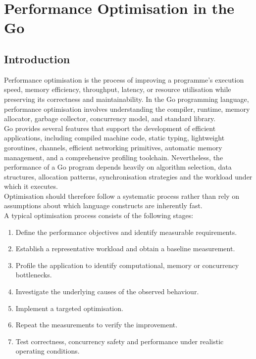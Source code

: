 \section{Performance Optimisation in the Go}

\subsection{Introduction}

Performance optimisation is the process of improving a programme's execution speed, memory efficiency, throughput, latency, or resource utilisation while preserving its correctness and maintainability. In the Go programming language, performance optimisation involves understanding the compiler, runtime, memory allocator, garbage collector, concurrency model, and standard library.\\

Go provides several features that support the development of efficient applications, including compiled machine code, static typing, lightweight goroutines, channels, efficient networking primitives, automatic memory management, and a comprehensive profiling toolchain. Nevertheless, the performance of a Go program depends heavily on algorithm selection, data structures, allocation patterns, synchronisation strategies and the workload under which it executes.\\

Optimisation should therefore follow a systematic process rather than rely on assumptions about which language constructs are inherently fast.\\

A typical optimisation process consists of the following stages:

\begin{enumerate}
    \item Define the performance objectives and identify measurable requirements.
    \item Establish a representative workload and obtain a baseline measurement.
    \item Profile the application to identify computational, memory or concurrency bottlenecks.
    \item Investigate the underlying causes of the observed behaviour.
    \item Implement a targeted optimisation.
    \item Repeat the measurements to verify the improvement.
    \item Test correctness, concurrency safety and performance under realistic operating conditions.
\end{enumerate}

